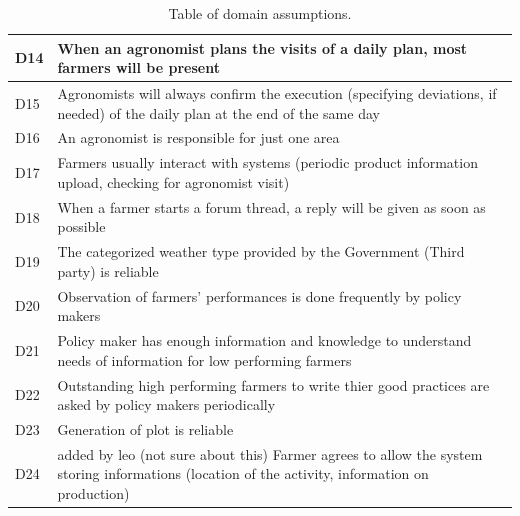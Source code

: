 \begin{table}[H]
\begin{tabular}{|l|m{}|}
        \hline
        \textsc{D14}  &    When an agronomist plans the visits of a daily plan, most farmers will be present\\
        \hline
        \textsc{D15}  &    Agronomists will always confirm the execution (specifying deviations, if needed) of the daily plan at the end of the same day\\
        \hline
        \textsc{D16}  &    An agronomist is responsible for just one area\\
        \hline
        \textsc{D17}  &    Farmers usually interact with systems (periodic product information upload, checking for agronomist visit) \\
        \hline
        \textsc{D18}     &   When a farmer starts a forum thread, a reply will be given as soon as possible \\
        \hline
        \textsc{D19}  &    The categorized weather type provided by the Government (Third party) is reliable\\
        \hline
        \textsc{D20}  &    Observation of  farmers' performances is done frequently by policy makers\\
        \hline
        \textsc{D21}  &    Policy maker has enough information and knowledge to understand needs of information for low performing farmers\\
        \hline
        \textsc{D22}  &    Outstanding high performing farmers to write thier good practices are asked by policy makers periodically\\
        \hline
        \textsc{D23}  &    Generation of plot is reliable\\
        \hline
        \textsc{D24}  &    added by leo (not sure about this)	Farmer agrees to allow the system storing informations (location of the activity, information on production)\\
        \hline
        
    \end{tabular}
    
    \caption{\label{tab:domainAssumptions}Table of domain assumptions.}
    
\end{table}